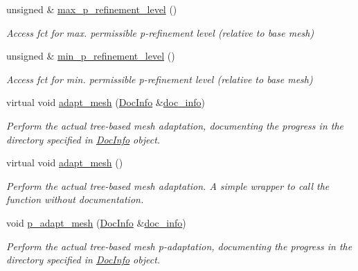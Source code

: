 \begin{DoxyCompactItemize}
unsigned \& \hyperlink{classoomph_1_1TreeBasedRefineableMeshBase_a957a33d2b7dd59f8789f4d0e9c6357c2}{max\+\_\+p\+\_\+refinement\+\_\+level} ()
\begin{DoxyCompactList}\small\item\em Access fct for max. permissible p-\/refinement level (relative to base mesh) \end{DoxyCompactList}\item 
unsigned \& \hyperlink{classoomph_1_1TreeBasedRefineableMeshBase_a42486bb8abcb77663adc361eaa442a3b}{min\+\_\+p\+\_\+refinement\+\_\+level} ()
\begin{DoxyCompactList}\small\item\em Access fct for min. permissible p-\/refinement level (relative to base mesh) \end{DoxyCompactList}\item 
virtual void \hyperlink{classoomph_1_1TreeBasedRefineableMeshBase_acef8ac2f0f2cffe938031db1499c598b}{adapt\+\_\+mesh} (\hyperlink{classoomph_1_1DocInfo}{Doc\+Info} \&\hyperlink{classoomph_1_1RefineableMeshBase_a266f8b2a1499cc2ae7b24b19813923ee}{doc\+\_\+info})
\begin{DoxyCompactList}\small\item\em Perform the actual tree-\/based mesh adaptation, documenting the progress in the directory specified in \hyperlink{classoomph_1_1DocInfo}{Doc\+Info} object. \end{DoxyCompactList}\item 
virtual void \hyperlink{classoomph_1_1TreeBasedRefineableMeshBase_a64608ddedb7eb56e11bee2805aa01360}{adapt\+\_\+mesh} ()
\begin{DoxyCompactList}\small\item\em Perform the actual tree-\/based mesh adaptation. A simple wrapper to call the function without documentation. \end{DoxyCompactList}\item 
void \hyperlink{classoomph_1_1TreeBasedRefineableMeshBase_a5d714967dc71ba477c2ca807bbf6d6bd}{p\+\_\+adapt\+\_\+mesh} (\hyperlink{classoomph_1_1DocInfo}{Doc\+Info} \&\hyperlink{classoomph_1_1RefineableMeshBase_a266f8b2a1499cc2ae7b24b19813923ee}{doc\+\_\+info})
\begin{DoxyCompactList}\small\item\em Perform the actual tree-\/based mesh p-\/adaptation, documenting the progress in the directory specified in \hyperlink{classoomph_1_1DocInfo}{Doc\+Info} object. \end{DoxyCompactList}\item 

\end{DoxyCompactItemize}
